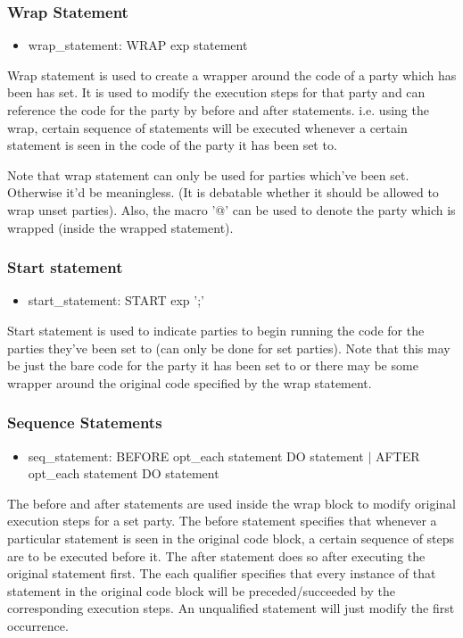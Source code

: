 \documentclass{article}
\begin{document}
\subsubsection{Wrap Statement}

\begin{itemize}
\item wrap\_statement: WRAP exp statement
\end{itemize}

Wrap statement is used to create a wrapper around the code of a party which has been has set. It is used to modify the execution steps for that party and can reference the code for the party by before and after statements. i.e. using the wrap, certain sequence of statements will be executed whenever a certain statement is seen in the code of the party it has been set to.

Note that wrap statement can only be used for parties which've been set. Otherwise it'd be meaningless. (It is debatable whether it should be allowed to wrap unset parties). Also, the macro '@' can be used to denote the party which is wrapped (inside the wrapped statement).

\subsubsection{Start statement}
\begin{itemize}
\item start\_statement: START exp ';'
\end{itemize}

Start statement is used to indicate parties to begin running the code for the parties they've been set to (can only be done for set parties). Note that this may be just the bare code for the party it has been set to or there may be some wrapper around the original code specified by the wrap statement.

\subsubsection{Sequence Statements}
\begin{itemize}
\item seq\_statement: BEFORE opt\_each statement DO statement $|$ AFTER opt\_each statement DO statement
\end{itemize}

The before and after statements are used inside the wrap block to modify original execution steps for a set party. The before statement specifies that whenever a particular statement is seen in the original code block, a certain sequence of steps are to be executed before it. The after statement does so after executing the original statement first. The each qualifier specifies that every instance of that statement in the original code block will be preceded/succeeded by the corresponding execution steps. An unqualified statement will just modify the first occurrence.
\end{document}
